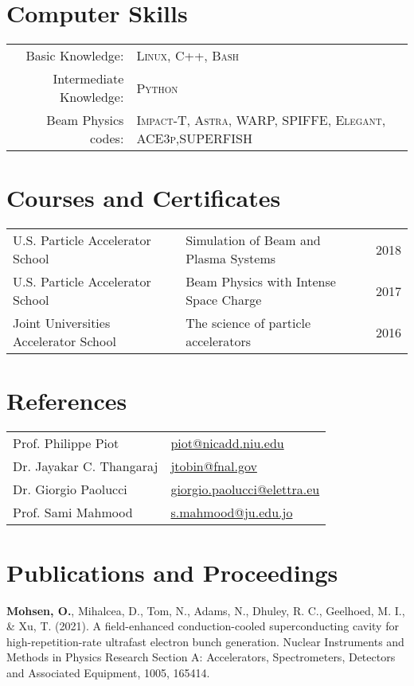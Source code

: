 \documentclass[a4paper,10pt]{article}
\begin{document}
\section{Computer Skills}
\begin{tabular}{rl}
Basic Knowledge:& \textsc{Linux}, \textsc{C++}, \textsc{Bash} \\
Intermediate Knowledge:& \textsc{Python}\\
Beam Physics codes: & \textsc{Impact-T, Astra, WARP, SPIFFE, Elegant, ACE3p,SUPERFISH}
\end{tabular}


\section{Courses and Certificates}
\begin{tabular}{lll}
U.S. Particle Accelerator School & Simulation of Beam and Plasma Systems &  2018 \\
U.S. Particle Accelerator School & 	Beam Physics with Intense Space Charge &  2017 \\
Joint Universities Accelerator School & The science of particle accelerators & 2016 \\
\end{tabular}


\section{References}

\begin{tabularx}{\textwidth}{X X}
    Prof. Philippe Piot  &  \href{mailto:piot@nicadd.niu.edu}{piot@nicadd.niu.edu} \\
    Dr. Jayakar C. Thangaraj  & \href{mailto:jtobin@fnal.gov}{jtobin@fnal.gov} \\
    Dr. Giorgio Paolucci &  
    \href{mailto:giorgio.paolucci@elettra.eu}{giorgio.paolucci@elettra.eu} \\
    
    Prof. Sami Mahmood & \href{mailto:s.mahmood@ju.edu.jo}{s.mahmood@ju.edu.jo}\\
    \end{tabularx}
\newpage
\section{Publications and Proceedings}

\textbf{Mohsen, O.}, Mihalcea, D., Tom, N., Adams, N., Dhuley, R. C., Geelhoed, M. I., \& Xu, T. (2021). A field-enhanced conduction-cooled superconducting cavity for high-repetition-rate ultrafast electron bunch generation. Nuclear Instruments and Methods in Physics Research Section A: Accelerators, Spectrometers, Detectors and Associated Equipment, 1005, 165414. \\
\end{document}
